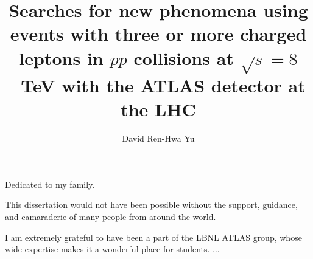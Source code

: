 \documentclass[english]{ucbthesis}
\begin{document}

\title{Searches for new phenomena using events with three or more charged leptons in $pp$ collisions at $\sqrt{s}=8$~TeV with the ATLAS detector at the LHC}
\author{David Ren-Hwa Yu}




\maketitle
\copyrightpage



\begin{frontmatter}

\begin{dedication}
\null\vfil
\begin{center}
Dedicated to my family.
\end{center}
\vfil\null
\end{dedication}

\tableofcontents
\clearpage
\listoffigures
\clearpage
\listoftables

\begin{acknowledgements}
This dissertation would not have been possible without the support, guidance, and camaraderie of many people from around the world. 

I am extremely grateful to have been a part of the LBNL ATLAS group, whose wide expertise makes it a wonderful place for students. ...

\end{acknowledgements}

\end{frontmatter}

\pagestyle{headings}













\end{document}
